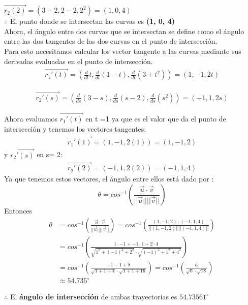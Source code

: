 \documentclass[12pt]{article}
\begin{document}
\item $\vec{r_2(2)}=(3-2,2-2,2^2) = (1, 0, 4)$ \\
  $\therefore$ El punto donde se intersectan las curvas es \textbf{(1, 0, 4)}
  \\
  Ahora, el ángulo entre dos curvas que se intersectan se define como el ángulo entre las dos tangentes de las dos curvas en el punto de intersección.\\
  Para esto necesitamos calcular los  vector tangente a las curvas mediante sus derivadas evaluadas en el punto de intersección.
\begin{align*}
    \vec{r_1'(t)} = \left( \frac{d}{dt} t, \frac{d}{dt}  (1-t), \frac{d}{dt} (3+t^2) \right) =  (1, -1, 2t)
\end{align*}

\begin{align*}
    \vec{r_2'(s)} = \left( \frac{d}{ds} (3-s),\frac{d}{ds} (s-2),\frac{d}{ds}(s^2)  \right) = (-1, 1, 2s) 
\end{align*}

Ahora evaluamos $\vec{r_1'(t)}$ en t =1 ya que es el valor que da el punto de intersección y tenemos los vectores tangentes:
\begin{align*}
    \vec{r_1'(1)} =  (1, -1, 2(1))  =(1, -1, 2)
\end{align*}
y  $\vec{r_2'(s)}$ en s= 2: 
\begin{align*}
  \vec{r_2'(2)} = (-1, 1, 2(2)) = (-1, 1, 4)
\end{align*}
Ya que tenemos estos vectores, el ángulo entre ellos está dado por :
\[
\theta = cos^{-1 }\left(\frac{\vec{u} \cdot \vec{v}}{||\vec{u}|| ||\vec{v}||}\right)
\]
Entonces
\begin{align*}
  \theta &= cos^{-1 }\left(\frac{\vec{u} \cdot \vec{v}}{||\vec{u}|| ||\vec{v}||}\right) = cos^{-1 }\left(\frac{(1, -1, 2) \cdot (-1, 1, 4)}{||(1, -1, 2)|| ||(-1, 1, 4)||}\right) \\
  &=  cos^{-1 }\left(  \frac{1 \cdot -1 + -1 \cdot 1 + 2 \cdot 4}{\sqrt{1^2 + (-1)^2 + 2^2} \cdot \sqrt{(-1)^2 + 1^2 + 4^2}} \right) \\
  &=  cos^{-1 }\left( \frac{-1  -1 + 8}{\sqrt{1 + 1 + 4} \cdot \sqrt{1 + 1 + 16}} \right)  =  cos^{-1 }\left( \frac{6}{\sqrt{6} \cdot \sqrt{18}}\right) \\
  &\approx 54.735 ^\circ 
\end{align*}

$\therefore$ El \textbf{ángulo de intersección} de ambas trayectorias es $54.73561 ^\circ$ 
\end{document}
